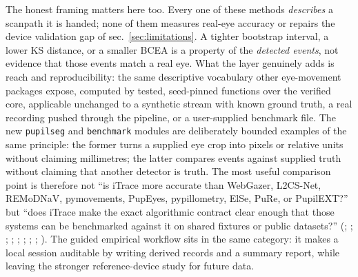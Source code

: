 \documentclass[
]{article}
\newcounter{none} %
\begin{document}
The honest framing matters here too. Every one of these methods
\emph{describes} a scanpath it is handed; none of them measures real-eye
accuracy or repairs the device validation gap of
sec.~\ref{sec:limitations}. A tighter bootstrap interval, a lower KS
distance, or a smaller BCEA is a property of the \emph{detected events},
not evidence that those events match a real eye. What the layer
genuinely adds is reach and reproducibility: the same descriptive
vocabulary other eye-movement packages expose, computed by tested,
seed-pinned functions over the verified core, applicable unchanged to a
synthetic stream with known ground truth, a real recording pushed
through the pipeline, or a user-supplied benchmark file. The new
\texttt{pupilseg} and \texttt{benchmark} modules are deliberately
bounded examples of the same principle: the former turns a supplied eye
crop into pixels or relative units without claiming millimetres; the
latter compares events against supplied truth without claiming that
another detector is truth. The most useful comparison point is therefore
not ``is iTrace more accurate than WebGazer, L2CS-Net, REMoDNaV,
pymovements, PupEyes, pypillometry, ElSe, PuRe, or PupilEXT?'' but
``does iTrace make the exact algorithmic contract clear enough that
those systems can be benchmarked against it on shared fixtures or public
datasets?'' (; ;
;
;
;
;
;
;
). The guided
empirical workflow sits in the same category: it makes a local session
auditable by writing derived records and a summary report, while leaving
the stronger reference-device study for future data.
\end{document}

